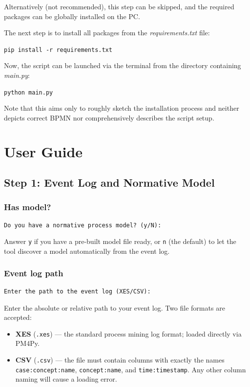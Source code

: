 \documentclass[12pt,a4paper]{article}
\begin{document}
Alternatively (not recommended), this step can be skipped, and the required packages can be globally installed on the PC.

The next step is to install all packages from the \textit{requirements.txt} file:
\begin{center}
\texttt{pip install -r requirements.txt}
\end{center}

Now, the script can be launched via the terminal from the directory containing \textit{main.py}:
\begin{center}
\texttt{python main.py}
\end{center}

Note that this aims only to roughly sketch the installation process and neither depicts correct BPMN nor comprehensively describes the script setup.

\section{User Guide}

\subsection{Step 1: Event Log and Normative Model}

\subsubsection{Has model?}
\begin{verbatim}
Do you have a normative process model? (y/N):
\end{verbatim}
Answer \texttt{y} if you have a pre-built model file ready, or \texttt{n} (the default) to let the tool discover a model automatically from the event log.

\subsubsection{Event log path}
\begin{verbatim}
Enter the path to the event log (XES/CSV):
\end{verbatim}
Enter the absolute or relative path to your event log. Two file formats are accepted:
\begin{itemize}
    \item \textbf{XES} (\texttt{.xes}) --- the standard process mining log format; loaded directly via PM4Py.
    \item \textbf{CSV} (\texttt{.csv}) --- the file must contain columns with exactly the names \verb|case:concept:name|, \verb|concept:name|, and \verb|time:timestamp|. Any other column naming will cause a loading error.
\end{itemize}
\end{document}
